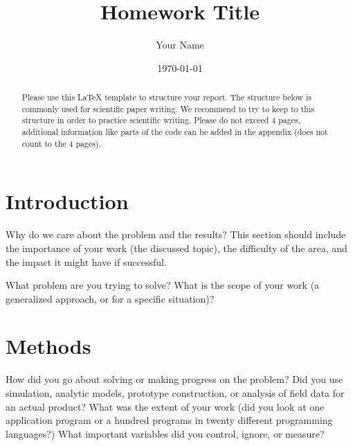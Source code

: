 \documentclass[%
 reprint,
 superscriptaddress,
 amsmath,amssymb,
pra,
]{revtex4-1}
\begin{document}

\title{Homework Title}

\author{Your Name}
%

\date{\today}%

\begin{abstract}
Please use this \LaTeX{} template to structure your report. The structure below is commonly used for scientific paper writing. We recommend to try to keep to this structure in order to practice scientific writing. Please do not exceed 4 pages, additional information like parts of the code can be added in the appendix (does not count to the 4 pages).
\end{abstract}

\maketitle



\section{Introduction}
\label{sec:introduction}

Why do we care about the problem and the results?  This section should include the importance of your work (the discussed topic), the difficulty of the area, and the impact it might have if successful.

What problem are you trying to solve? What is the scope of your work (a generalized approach, or for a specific situation)? 


\section{Methods}
\label{sec:methods}

How did you go about solving or making progress on the problem? Did you use simulation, analytic models, prototype construction, or analysis of field data for an actual product? What was the extent of your work (did you look at one application program or a hundred programs in twenty different programming languages?) What important variables did you control, ignore, or measure?
\end{document}
